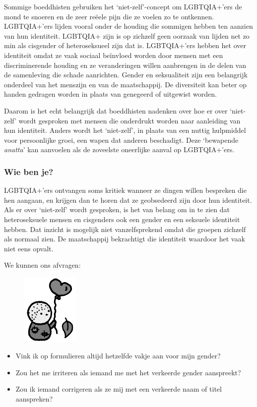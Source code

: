 \documentclass[12pt,openany]{book}
\begin{document}
Sommige boeddhisten gebruiken het ‘niet-zelf’-concept om LGBTQIA+’ers de mond te snoeren en de zeer reëele pijn die ze voelen zo te ontkennen. LGBTQIA+’ers lijden vooral onder de houding die sommigen hebben ten aanzien van hun identiteit. LGBTQIA+ zijn is op zichzelf geen oorzaak van lijden net zo min als cisgender of heteroseksueel zijn dat is. LGBTQIA+’ers hebben het over identiteit omdat ze vaak sociaal beïnvloed worden door mensen met een discriminerende houding en ze veranderingen willen aanbrengen in de delen van de samenleving die schade aanrichten. Gender en seksualiteit zijn een belangrijk onderdeel van het menszijn en van de maatschappij. De diversiteit kan beter op handen gedragen worden in plaats van genegeerd of uitgewist worden. 

Daarom is het echt belangrijk dat boeddhisten nadenken over hoe er over ‘niet-zelf’ wordt gesproken met mensen die onderdrukt worden naar aanleiding van hun identiteit. Anders wordt het ‘niet-zelf’, in plaats van een nuttig hulpmiddel voor persoonlijke groei, een wapen dat anderen beschadigt. Deze ‘bewapende \textit{anatta}’ kan aanvoelen als de zoveelste oneerlijke aanval op LGBTQIA+’ers.  

\subsubsection*{Wie ben je?}

LGBTQIA+’ers ontvangen soms kritiek wanneer ze dingen willen bespreken die hen aangaan, en krijgen dan te horen dat ze geobsedeerd zijn door hun identiteit. Als er over ‘niet-zelf’ wordt gesproken, is het van belang om in te zien dat heteroseksuele mensen en cisgenders ook een gender en een seksuele identiteit hebben. Dat inzicht is mogelijk niet vanzelfsprekend omdat die groepen zichzelf als normaal zien. De maatschappij bekrachtigt die identiteit waardoor het vaak niet eens opvalt.

We kunnen ons afvragen:
\begin{figure}
    \centering
    \includegraphics[width=0.25\textwidth]{33bw.png}
\end{figure}
\begin{itemize}
\setlength\itemsep{-0.3em}
\item Vink ik op formulieren altijd hetzelfde vakje aan voor mijn gender?
\item Zou het me irriteren als iemand me met het verkeerde gender aanspreekt?
\item Zou ik iemand corrigeren als ze mij met een verkeerde naam of titel aanspreken?
\end{itemize}
\end{document}
